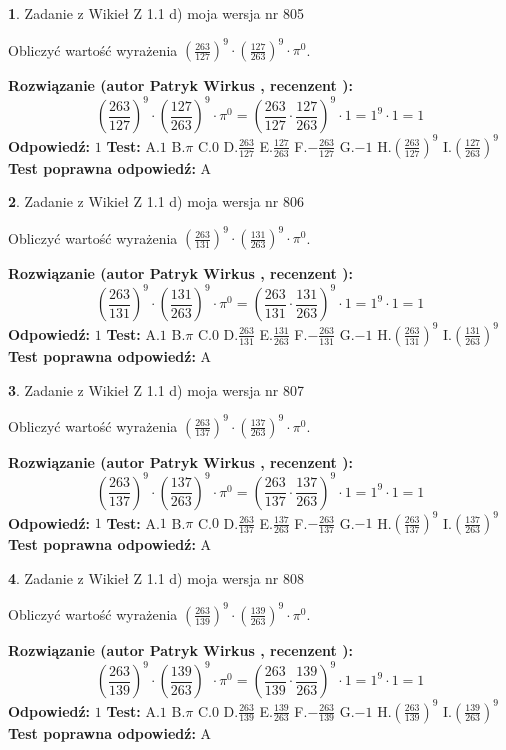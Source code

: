 \documentclass[12pt, a4paper]{article}
\theoremstyle{definition} %
\newtheorem{zad}{}
\newcommand{\zadStart}[1]{\begin{zad}#1\newline}
\newcommand{\zadStop}{\end{zad}}
\newcommand{\rozwStart}[2]{\noindent \textbf{Rozwiązanie (autor #1 , recenzent #2): }\newline}
\newcommand{\rozwStop}{\newline}
\newcommand{\odpStart}{\noindent \textbf{Odpowiedź:}\newline}
\newcommand{\odpStop}{\newline}
\newcommand{\testStart}{\noindent \textbf{Test:}\newline}
\newcommand{\testStop}{\newline}
\newcommand{\kluczStart}{\noindent \textbf{Test poprawna odpowiedź:}\newline}
\newcommand{\kluczStop}{\newline}
\begin{document}
\zadStart{Zadanie z Wikieł Z 1.1 d) moja wersja nr 805}

Obliczyć wartość wyrażenia $(\frac{263}{127})^{9} \cdot (\frac{127}{263})^{9} \cdot \pi^{0}$.
\zadStop
\rozwStart{Patryk Wirkus}{}
$$(\frac{263}{127})^{9} \cdot (\frac{127}{263})^{9} \cdot \pi^{0} = (\frac{263}{127} \cdot \frac{127}{263})^{9} \cdot 1 = 1^{9} \cdot 1 = 1$$
\rozwStop
\odpStart
$1$
\odpStop
\testStart
A.$1$ B.$\pi$ C.$0$ D.$\frac{263}{127}$ E.$\frac{127}{263}$
F.$-\frac{263}{127}$ G.$-1$
H.$(\frac{263}{127})^{9}$
I.$(\frac{127}{263})^{9}$
\testStop
\kluczStart
A
\kluczStop



\zadStart{Zadanie z Wikieł Z 1.1 d) moja wersja nr 806}

Obliczyć wartość wyrażenia $(\frac{263}{131})^{9} \cdot (\frac{131}{263})^{9} \cdot \pi^{0}$.
\zadStop
\rozwStart{Patryk Wirkus}{}
$$(\frac{263}{131})^{9} \cdot (\frac{131}{263})^{9} \cdot \pi^{0} = (\frac{263}{131} \cdot \frac{131}{263})^{9} \cdot 1 = 1^{9} \cdot 1 = 1$$
\rozwStop
\odpStart
$1$
\odpStop
\testStart
A.$1$ B.$\pi$ C.$0$ D.$\frac{263}{131}$ E.$\frac{131}{263}$
F.$-\frac{263}{131}$ G.$-1$
H.$(\frac{263}{131})^{9}$
I.$(\frac{131}{263})^{9}$
\testStop
\kluczStart
A
\kluczStop



\zadStart{Zadanie z Wikieł Z 1.1 d) moja wersja nr 807}

Obliczyć wartość wyrażenia $(\frac{263}{137})^{9} \cdot (\frac{137}{263})^{9} \cdot \pi^{0}$.
\zadStop
\rozwStart{Patryk Wirkus}{}
$$(\frac{263}{137})^{9} \cdot (\frac{137}{263})^{9} \cdot \pi^{0} = (\frac{263}{137} \cdot \frac{137}{263})^{9} \cdot 1 = 1^{9} \cdot 1 = 1$$
\rozwStop
\odpStart
$1$
\odpStop
\testStart
A.$1$ B.$\pi$ C.$0$ D.$\frac{263}{137}$ E.$\frac{137}{263}$
F.$-\frac{263}{137}$ G.$-1$
H.$(\frac{263}{137})^{9}$
I.$(\frac{137}{263})^{9}$
\testStop
\kluczStart
A
\kluczStop



\zadStart{Zadanie z Wikieł Z 1.1 d) moja wersja nr 808}

Obliczyć wartość wyrażenia $(\frac{263}{139})^{9} \cdot (\frac{139}{263})^{9} \cdot \pi^{0}$.
\zadStop
\rozwStart{Patryk Wirkus}{}
$$(\frac{263}{139})^{9} \cdot (\frac{139}{263})^{9} \cdot \pi^{0} = (\frac{263}{139} \cdot \frac{139}{263})^{9} \cdot 1 = 1^{9} \cdot 1 = 1$$
\rozwStop
\odpStart
$1$
\odpStop
\testStart
A.$1$ B.$\pi$ C.$0$ D.$\frac{263}{139}$ E.$\frac{139}{263}$
F.$-\frac{263}{139}$ G.$-1$
H.$(\frac{263}{139})^{9}$
I.$(\frac{139}{263})^{9}$
\testStop
\kluczStart
A
\kluczStop
\end{document}
